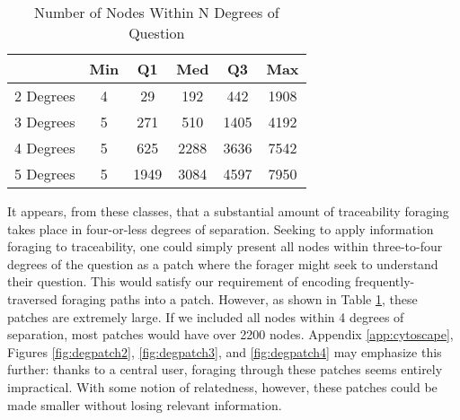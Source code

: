 \begin{table}[!ht]
	\caption{Number of Nodes Within N Degrees of Question}
	\centering
		\begin{tabular}{ |c||c|c|c|c|c|  }
		\hline
		& Min & Q1 & Med & Q3 & Max \\
		\hline
		2 Degrees & 4 & 29   & 192  & 442  & 1908 \\
		3 Degrees & 5 & 271  & 510  & 1405 & 4192 \\
		4 Degrees & 5 & 625  & 2288 & 3636 & 7542 \\
		5 Degrees & 5 & 1949 & 3084 & 4597 & 7950 \\
		\hline
	\end{tabular}
	\label{tab:radiusStats}
\end{table}

It appears, from these classes, that a substantial amount of traceability foraging takes place in four-or-less degrees of separation. Seeking to apply information foraging to traceability, one could simply present all nodes within three-to-four degrees of the question as a patch where the forager might seek to understand their question. This would satisfy our requirement of encoding frequently-traversed foraging paths into a patch. However, as shown in Table \ref{tab:radiusStats}, these patches are extremely large. If we included all nodes within 4 degrees of separation, most patches would have over 2200 nodes. Appendix \ref{app:cytoscape}, Figures \ref{fig:degpatch2}, \ref{fig:degpatch3}, and \ref{fig:degpatch4} may emphasize this further: thanks to a central user, foraging through these patches seems entirely impractical. With some notion of relatedness, however, these patches could be made smaller without losing relevant information.